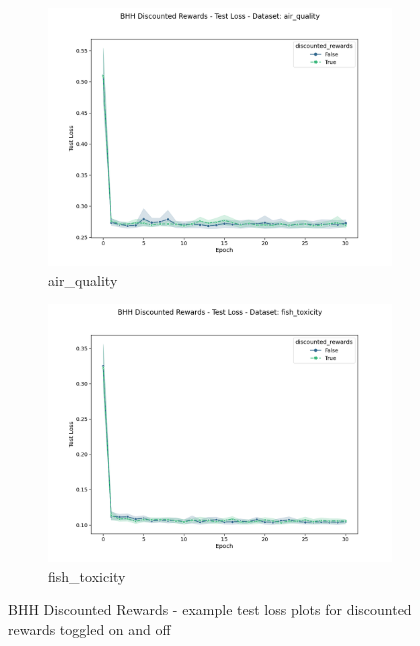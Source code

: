 \begin{figure}[htbp]
	\begin{subfigure}{0.5\textwidth}
    	\centering
        \includegraphics[width=\textwidth]{analysis/bhh_discounted_rewards/figures/test/loss/air_quality.png}
        \caption{air\_quality}
        \label{fig:results:discounted_rewards:figures:loss1}
	\end{subfigure}
	\begin{subfigure}{0.5\textwidth}
    	\centering
        \includegraphics[width=\textwidth]{analysis/bhh_discounted_rewards/figures/test/loss/fish_toxicity.png}
        \caption{fish\_toxicity}
        \label{fig:results:discounted_rewards:figures:loss2}
	\end{subfigure}
	\caption{\Acs{BHH} Discounted Rewards - example test loss plots for discounted rewards toggled on and off}
	\label{fig:results:discounted_rewards:figures:loss}
\end{figure}

